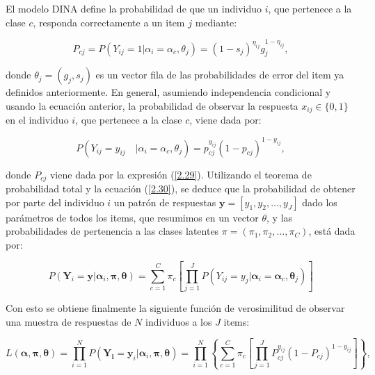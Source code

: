			El modelo DINA define la probabilidad de que un individuo $i$, que pertenece a la clase $c$, responda correctamente a un item $j$ mediante:
			
			\begin{equation}
				P_{c j}=P\left(Y_{i j}=1 | \alpha_{i}=\alpha_{c}, \theta_{j}\right)=\left(1-s_{j}\right)^{\eta_{i j}} g_{j}^{1-\eta_{i j}}, \label{2.29}
			\end{equation}
			
			donde $\theta_{ j }=({ g }_{ j },{ s }_{ j })$ es un vector fila de las probabilidades de error del item ya definidos anteriormente. En general, asumiendo independencia condicional y usando la ecuaci\'{o}n anterior, la probabilidad de observar la respuesta $x_{i j} \in\{0,1\}$  en el individuo $i$, que pertenece a la clase $c$, viene dada por:
			
			\begin{equation}
				P({ Y }_{ ij }={ y }_{ ij }\quad|{ \alpha  }_{ i }={ \alpha}_{ c },{ \theta  }_{ j })=p_{ cj }^{ { y }_{ ij } }(1-p_{ cj })^{ 1-{ y }_{ ij }}, \label{2.30}
			\end{equation}
			
			donde ${P}_{cj}$ viene dada por la expresi\'{o}n (\ref{2.29}).
			Utilizando el teorema de probabilidad total y la ecuaci\'{o}n (\ref{2.30}), se deduce que la probabilidad de obtener por parte del individuo $i$ un patr\'{o}n de respuestas $\boldsymbol{y}=[y_{1}, y_{2}, \ldots, y_{J}]$ dado los par\'{a}metros de todos los items, que resumimos en un vector $\theta$, y las probabilidades de pertenencia a las clases latentes $\pi=\left(\pi_{1}, \pi_{2}, \dots, \pi_{C}\right)$, est\'{a} dada por:
			
			\begin{equation}
				P\left(\boldsymbol{Y}_{i}=\boldsymbol{y}| \boldsymbol{\alpha}_{i}, \boldsymbol{\pi}, \boldsymbol{\theta}\right)=\sum_{c=1}^{C} \pi_{c}\left[\prod_{j=1}^{J} P\left(Y_{ij}=y_{j} | \boldsymbol{\alpha}_{i}=\boldsymbol{\alpha}_{c}, \boldsymbol{\theta}_{j}\right)\right] \label{2.31}  	
			\end{equation}
			
			Con esto se obtiene finalmente la siguiente funci\'{o}n de verosimilitud de observar una muestra de respuestas de $N$ individuos a los $J$ items:
			
			\begin{equation}
				L(\boldsymbol{\alpha}, \boldsymbol{\pi}, \boldsymbol{\theta})=\prod_{i=1}^{N} P\left(\boldsymbol{Y}_{\boldsymbol{i}}=\boldsymbol{y}_{i} | \boldsymbol{\alpha}_{i}, \boldsymbol{\pi}, \boldsymbol{\theta}\right)=\prod_{i=1}^{N}\left\{\sum_{c=1}^{C} \pi_{c}\left[\prod_{j=1}^{J} P_{c j}^{y_{i j}}\left(1-P_{c j}\right)^{1-y_{i j}}\right]\right\}, \label{2.32}  	
			\end{equation}
			
